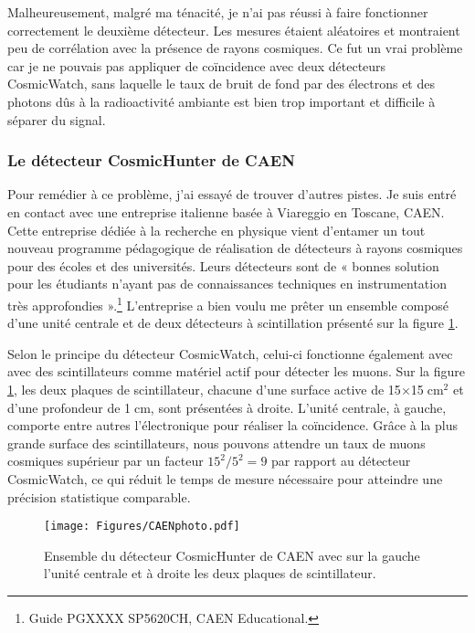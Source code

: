 \documentclass[a4paper, 12pt]{article}
\begin{document}
\begin{spacing}{1.5}
Malheureusement, malgré ma ténacité, je n'ai pas réussi à faire fonctionner correctement le deuxième détecteur. Les mesures étaient aléatoires et montraient peu de corrélation avec la présence de rayons cosmiques. Ce fut un vrai problème car je ne pouvais pas appliquer de coïncidence avec deux détecteurs CosmicWatch, sans laquelle le taux de bruit de fond par des électrons et des photons dûs à la radioactivité ambiante est bien trop important et difficile à séparer du signal. 

\subsubsection{Le détecteur CosmicHunter de CAEN}

Pour remédier à ce problème, j'ai essayé de trouver d'autres pistes. Je suis entré en contact avec une entreprise italienne basée à Viareggio en Toscane, CAEN. Cette entreprise dédiée à la recherche en physique vient d'entamer un tout nouveau programme pédagogique de réalisation de détecteurs à rayons cosmiques pour des écoles et des universités. Leurs détecteurs sont de « bonnes solution pour les étudiants n'ayant pas de connaissances techniques en instrumentation très approfondies ».\footnote{Guide PGXXXX SP5620CH, CAEN Educational.} L'entreprise a bien voulu me prêter un ensemble composé d'une unité centrale et de deux détecteurs à scintillation présenté sur la figure \ref{fig:CAENphoto}. 

Selon le principe du détecteur CosmicWatch, celui-ci fonctionne également avec avec des scintillateurs comme matériel actif pour détecter les muons. Sur la figure \ref{fig:CAENphoto}, les deux plaques de scintillateur, chacune d'une surface active de 15$\times$15$\;$cm$^2$ et d'une profondeur de 1$\;$cm, sont présentées à droite. L'unité centrale, à gauche, comporte entre autres l'électronique pour réaliser la coïncidence. Grâce à la plus grande surface des scintillateurs, nous pouvons attendre un taux de muons cosmiques supérieur par un facteur $15^2/5^2=9$ par rapport au détecteur CosmicWatch, ce qui réduit le temps de mesure nécessaire pour atteindre une précision statistique comparable. 

\begin{figure}[t]
\begin{center}
\texttt{[image: Figures/CAENphoto.pdf]}
\caption{\label{fig:CAENphoto} Ensemble du détecteur CosmicHunter de CAEN avec sur la gauche l'unité centrale et à droite les deux plaques de scintillateur.}
\end{center}
\end{figure}


\end{spacing}
\end{document}
